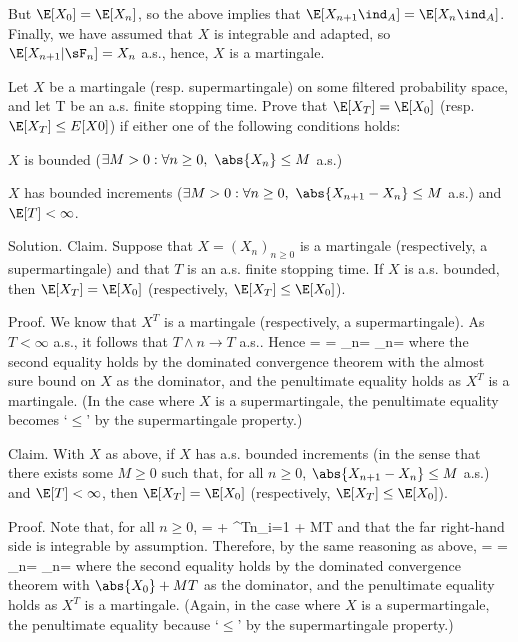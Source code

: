 But $\E[X_0] = \E[X_n]$, so the above implies that $\E[X_{n+1}\ind_A] = \E[X_n\ind_A]$. Finally, we have assumed that $X$ is integrable and adapted, so $\E[X_{n+1}|\sF_n] = X_n$ a.s., hence, $X$ is a martingale.

\vspace{2mm}

\qcutline


\item\label{exe:2.5} Let $X$ be a martingale (resp. supermartingale) on some filtered probability space, and let T be an a.s. finite stopping time. Prove that $\E[X_T ] = \E[X_0]$ (resp. $\E[X_T ] \leq E[X0]$) if either one of the following conditions holds:
\ben
\item [(i)] $X$ is bounded ($\exists M > 0 : \forall n \geq  0,\ \abs{X_n} \leq M$ a.s.)
\item [(ii)] $X$ has bounded increments ($\exists M > 0 : \forall n \geq  0,\ \abs{X_{n+1} -X_n} \leq M$ a.s.) and $\E[T] < \infty$.
\een

\scutline

Solution. Claim. Suppose that $X = (X_n)_{n\geq 0}$ is a martingale (respectively, a supermartingale) and that $T$ is an a.s. finite stopping time. If $X$ is a.s. bounded, then $\E[X_T ] = \E[X_0]$ (respectively, $\E[X_T ] \leq  \E[X_0]$).

Proof. We know that $X^T$ is a martingale (respectively, a supermartingale). As $T < \infty$ a.s., it follows that $T \land n \to T$ a.s.. Hence
\be
\E[X_T ] = \E{} = \lim_{n\to \infty}\E[X_{T\land n}] = \lim_{n\to \infty}\E[X_{T\land 0}] = \E[X_0]
\ee
where the second equality holds by the dominated convergence theorem with the almost sure bound on $X$ as the dominator, and the penultimate equality holds as $X^T$ is a martingale. (In the case where $X$ is a supermartingale, the penultimate equality becomes `$\leq$' by the supermartingale property.)

Claim. With $X$ as above, if $X$ has a.s. bounded increments (in the sense that there exists some $M \geq 0$ such that, for all $n \geq 0$, $\abs{X_{n+1} -X_n} \leq  M$ a.s.) and $\E[T] < \infty$, then $\E[X_T ] = \E[X_0]$ (respectively, $\E[X_T ] \leq \E[X_0]$).

Proof. Note that, for all $n \geq 0$,
\be
{} =  \leq  {} + \sum^{T\land n}_{i=1}  \leq {} + MT
\ee
and that the far right-hand side is integrable by assumption. Therefore, by the same reasoning as above,
\be
\E[X_T ] = \E{} = \lim_{n\to \infty}\E[X_{T\land n}] = \lim_{n\to \infty}\E[X_{T\land 0}] = \E[X_0]
\ee
where the second equality holds by the dominated convergence theorem with $\abs{X_0}+MT$ as the dominator, and the penultimate equality holds as $X^T$ is a martingale. (Again, in the case where $X$ is a supermartingale, the penultimate equality because `$\leq$' by the supermartingale property.)

